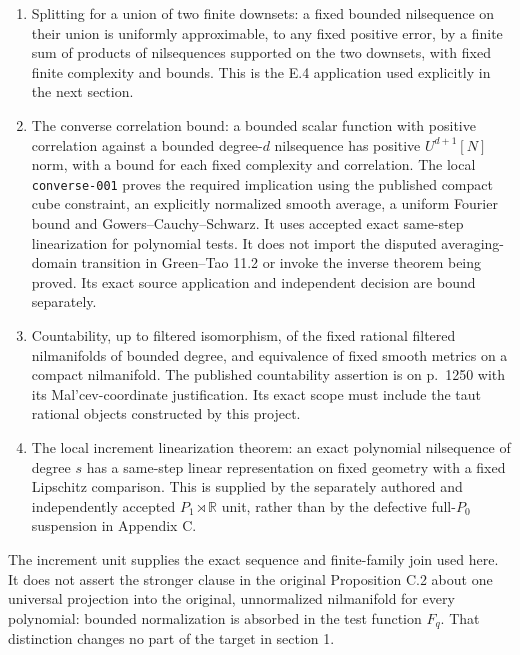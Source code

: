 \documentclass[11pt]{article}
\newcommand{\R}{\mathbb R}
\begin{document}
\begin{enumerate}
The E.11 and E.13 inputs require the
actual multivariable Appendix D.5 factorization and all-box reconstruction;
a one-variable D.4 proof does not supply that premise. This obligation
is supplied by the local multifactor theorem and its two independent decisions, as connected below.
\item Splitting for a union of two finite downsets: a fixed bounded
nilsequence on their union is uniformly approximable, to any fixed positive
error, by a finite sum of products of nilsequences supported on the two
downsets, with fixed finite complexity and bounds. This is the E.4
application used explicitly in the next section.
\item The converse correlation bound: a bounded scalar function with
positive correlation against a bounded degree-$d$ nilsequence has positive
$U^{d+1}[N]$ norm, with a bound for each fixed complexity and correlation.
The local \texttt{converse-001} proves the required implication using
the published compact cube constraint, an explicitly normalized smooth
average, a uniform Fourier bound and Gowers--Cauchy--Schwarz. It uses
accepted exact same-step linearization for polynomial tests. It does not
import the disputed averaging-domain transition in Green--Tao 11.2 or
invoke the inverse theorem being proved. Its exact source application
and independent decision are bound separately.
\item Countability, up to filtered isomorphism, of the fixed rational
filtered nilmanifolds of bounded degree, and equivalence of fixed smooth
metrics on a compact nilmanifold. The published countability assertion is
on p.~1250 with its Mal'cev-coordinate justification. Its exact scope must
include the taut rational objects constructed by this project.
\item The local increment linearization theorem: an exact polynomial
nilsequence of degree $s$ has a same-step linear representation on fixed
geometry with a fixed Lipschitz comparison. This is supplied by the
separately authored and independently accepted $P_1\rtimes\R$ unit,
rather than by the defective full-$P_0$ suspension in Appendix C.
\end{enumerate}

The increment unit supplies the exact sequence and finite-family join
used here. It does not assert the stronger clause in the original
Proposition C.2 about one universal projection into the original,
unnormalized nilmanifold for every polynomial: bounded normalization is
absorbed in the test function $F_q$. That distinction changes no part of
the target in section 1.
\end{document}

